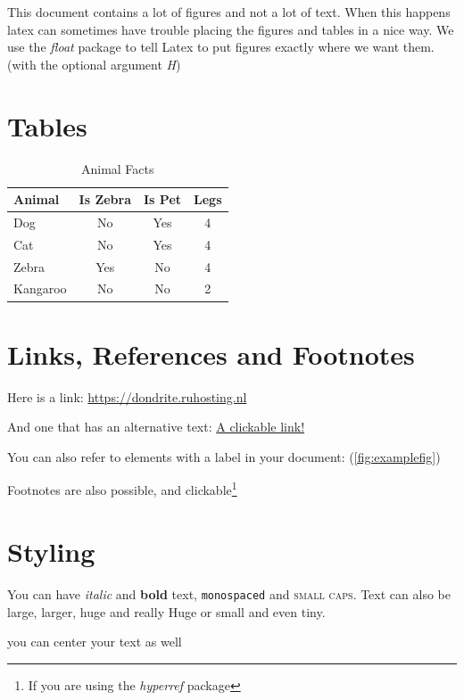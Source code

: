 \documentclass[12pt]{scrarticle}
\begin{document}
This document contains a lot of figures and not a lot of text. When this happens latex can sometimes have trouble placing the figures and tables in a nice way. We use the \textit{float} package to tell Latex to put figures exactly where we want them. (with the optional argument \textit{H})

\section{Tables}

\begin{table}[H]
    \centering
    \begin{tabular}{|l||c|c|c|}
    \hline 
    Animal & Is Zebra & Is Pet & Legs\\
    \hline\hline
    Dog         & No    & Yes   & 4\\
    Cat         & No    & Yes   & 4\\
    Zebra       & Yes   & No    & 4\\
    Kangaroo    & No    & No    & 2\\
    \hline
    \end{tabular}
    \caption{Animal Facts}
    \label{tab:my_label}
\end{table}

\section{Links, References and Footnotes}

Here is a link: \url{https://dondrite.ruhosting.nl}

And one that has an alternative text: \href{https://www.youtube.com/watch?v=dQw4w9WgXcQ}{A clickable link!}

You can also refer to elements with a label in your document: (\ref{fig:examplefig})

Footnotes are also possible, and clickable\footnote{If you are using the \textit{hyperref} package}

\section{Styling}

You can have \textit{italic} and \textbf{bold} text, \texttt{monospaced} and \textsc{small caps}. Text can also be {\large{large}}, {\Large{larger}}, {\huge huge} and {\Huge really Huge} or {\small{small}} and even {\tiny tiny}.

\begin{center}
    you can center your text as well
\end{center}
\end{document}

